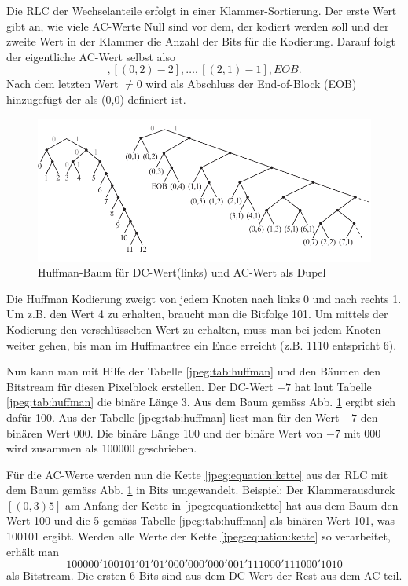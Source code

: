 Die RLC der Wechselanteile erfolgt in einer Klammer-Sortierung.
Der erste Wert gibt an, wie viele AC-Werte Null sind vor dem, der kodiert werden soll und der zweite Wert in der Klammer die Anzahl der Bits für die Kodierung.
Darauf folgt der eigentliche AC-Wert selbst also 
\begin{equation}
    [(0,3)5],[(0,2)-2], \dots, [(2,1)-1], EOB.
    \label{jpeg:equation:kette}
\end{equation}
Nach dem letzten Wert \(\neq 0\) wird als Abschluss der End-of-Block (EOB) hinzugefügt der als (0,0) definiert ist.

\begin{figure}[t]
    \centering
    \includegraphics[width=\textwidth]{papers/jpeg/pictures/huffman.pdf}
    \caption{Huffman-Baum für DC-Wert(links) und AC-Wert als Dupel 
        \label{jpeg:fig:huffman}}
\end{figure}

Die Huffman Kodierung zweigt von jedem Knoten nach links 0 und nach rechts 1.
Um z.B. den Wert 4 zu erhalten, braucht man die Bitfolge 101.
Um mittels der Kodierung den verschlüsselten Wert zu erhalten, muss man bei jedem Knoten weiter gehen, bis man im Huffmantree ein Ende erreicht (z.B. 1110 entspricht 6).

Nun kann man mit Hilfe der Tabelle \ref{jpeg:tab:huffman} und den Bäumen den Bitstream für diesen Pixelblock erstellen.
Der DC-Wert \(-7\) hat laut Tabelle \ref{jpeg:tab:huffman} die binäre Länge 3.
Aus dem Baum gemäss Abb. \ref{jpeg:fig:huffman} ergibt sich dafür 100.
Aus der Tabelle \ref{jpeg:tab:huffman} liest man für den Wert \(-7\) den binären Wert 000.
Die binäre Länge 100 und der binäre Wert von \(-7\) mit 000 wird zusammen als 100000 geschrieben.

Für die AC-Werte werden nun die Kette \eqref{jpeg:equation:kette} aus der RLC mit dem Baum gemäss Abb. \ref{jpeg:fig:huffman} in Bits umgewandelt.
Beispiel: Der Klammerausdurck \([(0,3)5]\) am Anfang der Kette in \eqref{jpeg:equation:kette} hat aus dem Baum den Wert 100 und die 5 gemäss Tabelle \ref{jpeg:tab:huffman} als binären Wert 101, was 100101 ergibt.
Werden alle Werte der Kette \eqref{jpeg:equation:kette} so verarbeitet, erhält man
\begin{equation}
    100000'100101'01'01'000'000'000'001'111000'111000'1010    
\end{equation}
als Bitstream.
Die ersten 6 Bits sind aus dem DC-Wert der Rest aus dem AC teil.

